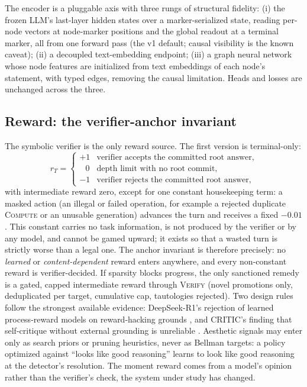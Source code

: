 The encoder is a pluggable axis with three rungs of structural fidelity:
(i) the frozen LLM's last-layer hidden states over a marker-serialized
state, reading per-node vectors at node-marker positions and the global
readout at a terminal marker, all from one forward pass (the v1 default;
causal visibility is the known caveat); (ii) a decoupled text-embedding
endpoint; (iii) a graph neural network whose node features are initialized
from text embeddings of each node's statement, with typed edges, removing
the causal limitation. Heads and losses are unchanged across the three.

\subsection{Reward: the verifier-anchor invariant}
\label{sec:method-reward}

The symbolic verifier is the only reward source. The first version is
terminal-only:
\[
r_T =
\begin{cases}
+1 & \text{verifier accepts the committed root answer,}\\
\;\;\,0 & \text{depth limit with no root commit,}\\
-1 & \text{verifier rejects the committed root answer,}
\end{cases}
\]
with intermediate reward zero, except for one constant housekeeping term:
a masked action (an illegal or failed operation, for example a rejected
duplicate \textsc{Compute} or an unusable generation) advances the turn
and receives a fixed $-0.01$. This constant carries no task information,
is not produced by the verifier or by any model, and cannot be gamed
upward; it exists so that a wasted turn is strictly worse than a legal
one. The anchor invariant is therefore precisely: no \emph{learned} or
\emph{content-dependent} reward enters anywhere, and every non-constant
reward is verifier-decided. If sparsity blocks progress, the only
sanctioned remedy is a gated, capped intermediate reward through
\textsc{Verify} (novel promotions only, deduplicated per target, cumulative
cap, tautologies rejected). Two design rules follow the strongest available
evidence: DeepSeek-R1's rejection of learned process-reward models on
reward-hacking grounds \citep{deepseekr1}, and CRITIC's finding that
self-critique without external grounding is unreliable \citep{critic}.
Aesthetic signals may enter only as search priors or pruning heuristics,
never as Bellman targets: a policy optimized against ``looks like good
reasoning'' learns to look like good reasoning at the detector's
resolution. The moment reward comes from a model's opinion rather than the
verifier's check, the system under study has changed.
